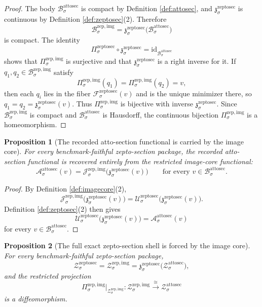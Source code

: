 \documentclass[11pt]{article}
\newcommand{\AttoSectionBody}[1]{\mathcal B_{#1}^{\mathrm{attosec}}}
\newcommand{\AttoSectionFunctional}[1]{\mathscr A_{#1}^{\mathrm{attosec}}}
\newcommand{\AttoSectionShell}[1]{\mathcal Z_{#1}^{\mathrm{attosec}}}
\newcommand{\ZeptoSectionProj}[1]{\Pi_{#1}^{\mathrm{zeptosec}}}
\newcommand{\ZeptoSectionFiber}[2]{\mathcal F_{#1}^{\mathrm{zeptosec}}(#2)}
\newcommand{\ZeptoSectionAttoMin}[1]{\mathfrak z_{#1}^{\mathrm{zeptosec}}}
\newcommand{\ZeptoSectionFunctional}[1]{\mathscr U_{#1}^{\mathrm{zeptosec}}}
\newcommand{\ZeptoSectionShell}[1]{\mathcal Z_{#1}^{\mathrm{zeptosec}}}
\newcommand{\ZeptoImgBody}[1]{\mathcal B_{#1}^{\mathrm{zep,img}}}
\newcommand{\ZeptoImgProj}[1]{\Pi_{#1}^{\mathrm{zep,img}}}
\newcommand{\ZeptoImgFunctional}[1]{\mathscr J_{#1}^{\mathrm{zep,img}}}
\newcommand{\ZeptoImgShell}[1]{\mathcal Z_{#1}^{\mathrm{zep,img}}}
\newtheorem{proposition}{Proposition}
\begin{document}
\begin{proof}
The body \(\AttoSectionBody{\sigma}\) is compact by Definition \ref{def:attosec}, and \(\ZeptoSectionAttoMin{\sigma}\) is continuous by Definition \ref{def:zeptosec}(2). Therefore
\[
\ZeptoImgBody{\sigma}
=
\ZeptoSectionAttoMin{\sigma}\bigl(\AttoSectionBody{\sigma}\bigr)
\]
is compact. The identity
\[
\ZeptoSectionProj{\sigma}\circ\ZeptoSectionAttoMin{\sigma}
=
\mathrm{id}_{\AttoSectionBody{\sigma}}
\]
shows that \(\ZeptoImgProj{\sigma}\) is surjective and that \(\ZeptoSectionAttoMin{\sigma}\) is a right inverse for it. If \(q_{1},q_{2}\in\ZeptoImgBody{\sigma}\) satisfy
\[
\ZeptoImgProj{\sigma}(q_{1})=\ZeptoImgProj{\sigma}(q_{2})=v,
\]
then each \(q_{i}\) lies in the fiber \(\ZeptoSectionFiber{\sigma}{v}\) and is the unique minimizer there, so \(q_{1}=q_{2}=\ZeptoSectionAttoMin{\sigma}(v)\). Thus \(\ZeptoImgProj{\sigma}\) is bijective with inverse \(\ZeptoSectionAttoMin{\sigma}\). Since \(\ZeptoImgBody{\sigma}\) is compact and \(\AttoSectionBody{\sigma}\) is Hausdorff, the continuous bijection \(\ZeptoImgProj{\sigma}\) is a homeomorphism.
\end{proof}

\begin{proposition}[The recorded atto-section functional is carried by the image core]
\label{prop:functional}
For every benchmark-faithful zepto-section package, the recorded atto-section functional is recovered entirely from the restricted image-core functional:
\[
\AttoSectionFunctional{\sigma}(v)
=
\ZeptoImgFunctional{\sigma}\bigl(\ZeptoSectionAttoMin{\sigma}(v)\bigr)
\qquad
\text{for every }v\in\AttoSectionBody{\sigma}.
\]
\end{proposition}

\begin{proof}
By Definition \ref{def:imagecore}(2),
\[
\ZeptoImgFunctional{\sigma}\bigl(\ZeptoSectionAttoMin{\sigma}(v)\bigr)
=
\ZeptoSectionFunctional{\sigma}\bigl(\ZeptoSectionAttoMin{\sigma}(v)\bigr).
\]
Definition \ref{def:zeptosec}(2) then gives
\[
\ZeptoSectionFunctional{\sigma}\bigl(\ZeptoSectionAttoMin{\sigma}(v)\bigr)
=
\AttoSectionFunctional{\sigma}(v)
\]
for every \(v\in\AttoSectionBody{\sigma}\).
\end{proof}

\begin{proposition}[The full exact zepto-section shell is forced by the image core]
\label{prop:shell}
For every benchmark-faithful zepto-section package,
\[
\ZeptoSectionShell{\sigma}
=
\ZeptoImgShell{\sigma}
=
\ZeptoSectionAttoMin{\sigma}\bigl(\AttoSectionShell{\sigma}\bigr),
\]
and the restricted projection
\[
\ZeptoImgProj{\sigma}\big|_{\ZeptoImgShell{\sigma}}
:
\ZeptoImgShell{\sigma}\xrightarrow{\cong}\AttoSectionShell{\sigma}
\]
is a diffeomorphism.
\end{proposition}
\end{document}
